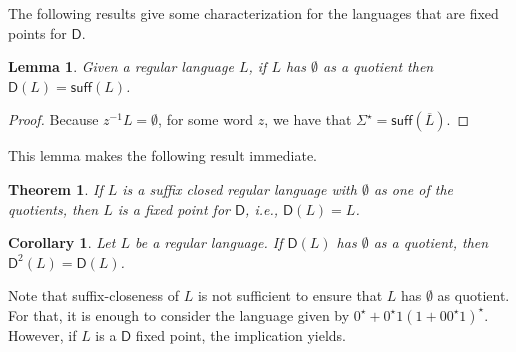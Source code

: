 \documentclass{article}
\newtheorem{lemma}{Lemma}
\newtheorem{theorem}{Theorem}
\newtheorem{corollary}{Corollary}
\newcommand{\comp}[1]{\overline{#1}}
\newcommand{\suff}[1]{\mathsf{suff}(#1)}
\newcommand{\dis}[1]{\mathsf{D}(#1)}
\newcommand{\diso}{\mathsf{D}}
\newcommand{\disn}[2]{\mathsf{D}^{#2}(#1)}
\newcommand{\kleene}[1]{#1^\star}
\begin{document}
The following results give some characterization for the languages
that are fixed points for $\diso$. 

\begin{lemma}
\label{lem:qempty}
Given a regular language $L$, if $L$ has $\emptyset$ as a quotient then $\dis{L}=\suff{L}$.
\end{lemma}

\begin{proof}
Because $z^{-1}L=\emptyset$, for some word $z$, we have that
$\kleene{\Sigma}= \suff{\comp{L}}$. 
\end{proof}
This lemma makes the following result immediate.
\begin{theorem}
\label{theo:ldirectdead}
 If $L$ is a suffix closed regular language with $\emptyset$ as one of the
 quotients,  then $L$ is a fixed point for $\diso$, i.e., $\dis{L}=L$.
\end{theorem}

\begin{corollary}
\label{cor:emptyquotient}
Let $L$ be a regular language. If $\dis{L}$ has $\emptyset$ as a quotient, then $\disn{L}{2}=\dis{L}$.
 \end{corollary}

Note that suffix-closeness of $L$ is not sufficient to ensure that $L$ has $\emptyset$ as quotient.
 For that, it is enough to consider the language given by $\kleene{0}+\kleene{0}1\kleene{(1+0\kleene{0}1)}$.
 However, if $L$ is a $\diso$ fixed point, the implication yields.
\end{document}
